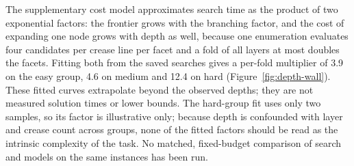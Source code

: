 The supplementary cost model approximates search time as the product of two exponential factors:
the frontier grows with the branching factor, and the cost of expanding one node grows with depth
as well, because one enumeration evaluates four candidates per crease line per facet and a fold of
all layers at most doubles the facets. Fitting both from the saved searches gives a per-fold
multiplier of 3.9 on the easy group, 4.6 on medium and 12.4 on hard
(Figure~\ref{fig:depth-wall}). These fitted curves extrapolate beyond the observed depths; they are not measured
solution times or lower bounds. The hard-group fit uses only two samples, so its factor is
illustrative only; because depth is confounded with layer and crease count across groups, none of
the fitted factors should be read as the intrinsic complexity of the task. No matched, fixed-budget comparison of
search and models on the same instances has been run.



